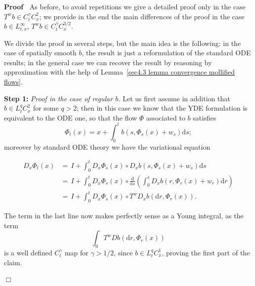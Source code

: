 \documentclass[10pt]{article}
\newcommand{\mathd}{\mathrm{d}}
\newcommand{\tmstrong}[1]{\textbf{#1}}
\newcommand{\tmtextit}[1]{{\itshape{#1}}}
\newenvironment{proof}{\noindent\textbf{Proof\ }}{\hspace*{\fill}$\Box$\medskip}
\begin{document}
\begin{proof}
  As before, to avoid repetitions we give a detailed proof only in the case
  $T^w b \in C^{\gamma}_t C^2_x$; we provide in the end the main differences
  of the proof in the case $b \in L^{\infty}_{t, x}$, $T^w b \in C^{\gamma}_t
  C^{3 / 2}_x$.
  
  We divide the proof in several steps, but the main idea is the following: in
  the case of spatially smooth $b$, the result is just a reformulation of the
  standard ODE results; in the general case we can recover the result by
  reasoning by approximation with the help of Lemma~\ref{sec4.3 lemma
  convergence mollified flows}.
  
  {\tmstrong{Step 1:}} \tmtextit{Proof in the case of regular $b$.} Let us
  first assume in addition that $b \in L^q_t C_x^2$ for some $q > 2$; then in
  this case we know that the YDE formulation is equivalent to the ODE one, so
  that the flow $\Phi$ associated to $b$ satisfies
  \[ \Phi_t (x) = x + \int_0^t b (s, \Phi_s (x) + w_s) \mathd s ; \]
  moreover by standard ODE theory we have the variational equation
  
  \begin{align*}
    D_x \Phi_t (x) & = \, I + \int_0^t D_x \Phi_s (x) \circ D_x b (s, \Phi_s
    (x) + w_s) \mathd s\\
    & = \, I + \int_0^t D_x \Phi_s (x) \circ \frac{\mathd}{\mathd s} \left(
    \int_0^s D_x b (r, \Phi_r (x) + w_r) \mathd r \right)\\
    & = \, I + \int_0^t D_x \Phi_s (x) \circ T^w D_x b (\mathd r, \Phi_r (x))
    .
  \end{align*}
  
  The term in the last line now makes perfectly sense as a Young integral, as
  the term
  \[ \int_0^{\cdot} T^w D b (\mathd r, \Phi_r (x)) \]
  is a well defined $C_t^{\gamma}$ map for $\gamma > 1 / 2$, since $b \in
  L^q_t C^1_x$, proving the first part of the claim.
  

\end{proof}
\end{document}
